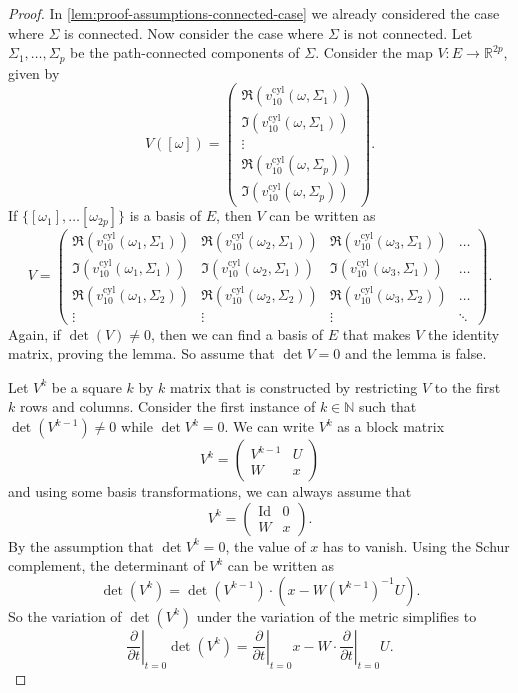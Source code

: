 \documentclass[10pt,a4paper]{amsart}
\newcommand{\N}{\mathbb{N}}
\newcommand{\R}{\mathbb{R}}
\newcommand{\del}{\partial}
\begin{document}
\begin{proof}
	In \cref{lem:proof-assumptions-connected-case} we already considered the case where $\Sigma$ is connected. Now consider the case where $\Sigma$ is not connected. Let $\Sigma_1, \ldots, \Sigma_p$ be the path-connected components of $\Sigma$.
	Consider the map $V \colon E \to \R^{2p}$, given by
	$$
	V([\omega]) = \begin{pmatrix}
		\Re(v^{\mathrm{cyl}}_{10}(\omega, \Sigma_1))\\ \Im(v^{\mathrm{cyl}}_{10}(\omega, \Sigma_1)) \\
		\vdots \\
		\Re(v^{\mathrm{cyl}}_{10}(\omega, \Sigma_p))\\ \Im(v^{\mathrm{cyl}}_{10}(\omega, \Sigma_p)) 
	\end{pmatrix}.$$
	If $\{[\omega_1], \ldots [\omega_{2p}]\}$ is a basis of $E$, then $V$ can be written as
	\begin{equation}
		\label{eq:variation:matrix-V}
		V = \begin{pmatrix}
			\Re(v^{\mathrm{cyl}}_{10}(\omega_1, \Sigma_1)) 
			& \Re(v^{\mathrm{cyl}}_{10}(\omega_2, \Sigma_1)) 
			& \Re(v^{\mathrm{cyl}}_{10}(\omega_3, \Sigma_1)) 
			& \ldots \\
			\Im(v^{\mathrm{cyl}}_{10}(\omega_1, \Sigma_1)) 
			& \Im(v^{\mathrm{cyl}}_{10}(\omega_2, \Sigma_1))
			& \Im(v^{\mathrm{cyl}}_{10}(\omega_3, \Sigma_1))
			& \ldots \\
			\Re(v^{\mathrm{cyl}}_{10}(\omega_1, \Sigma_2)) 
			& \Re(v^{\mathrm{cyl}}_{10}(\omega_2, \Sigma_2)) 
			& \Re(v^{\mathrm{cyl}}_{10}(\omega_3, \Sigma_2)) 
			& \ldots \\
			\vdots & \vdots & \vdots & \ddots
		\end{pmatrix}.
	\end{equation}
	Again, if $\det (V) \not = 0$, then we can find a basis of $E$ that makes $V$ the identity matrix, proving the lemma. So assume that $\det V = 0$ and the lemma is false.
	
	Let $V^k$ be a square $k$ by $k$ matrix that is constructed by restricting $V$ to the first $k$ rows and columns. Consider the first instance of $k \in \N$ such that $\det(V^{k-1}) \not = 0$ while $\det V^k = 0$.
	We can write $V^k$ as a block matrix
	$$
	V^k = \begin{pmatrix}
		V^{k-1} & U \\
		W & x
	\end{pmatrix}
	$$ 
	and using some basis transformations, we can always assume that 
	$$
	V^k = \begin{pmatrix}
		\operatorname{Id} & 0 \\
		W & x
	\end{pmatrix}.
	$$ 
	By the assumption that $\det V^k = 0$, the value of $x$ has to vanish. Using the Schur complement, the determinant of $V^k$ can be written as
	$$
	\det(V^k) = \det(V^{k-1}) \cdot (x - W (V^{k-1})^{-1} U).
	$$
	So the variation of $\det(V^k)$ under the variation of the metric simplifies to
	$$
	\left.\frac{\del }{\del t}\right|_{t=0} \det(V^k) = \left.\frac{\del}{\del t}\right|_{t=0} x - W\cdot \left.\frac{\del }{\del t}\right|_{t=0} U.
	$$


\end{proof}
\end{document}
